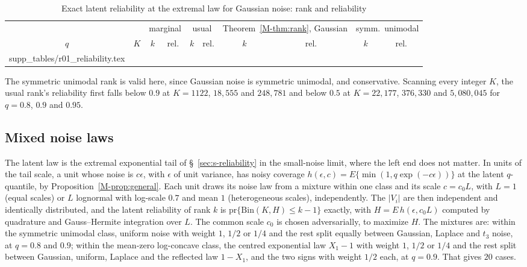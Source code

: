 \documentclass[12pt]{article}
\makeatletter
\newcommand{\tabinput}[1]{\@@input #1 }
\renewcommand{\_}{\usc\allowbreak}
\theoremstyle{definition}
\numberwithin{equation}{section}
\newcommand{\pr}{\mathrm{pr}}
\newcommand{\Bin}{\mathrm{Bin}}
\makeatother
\begin{document}
\begin{table}[htbp]
\renewcommand{\baselinestretch}{1}
\caption{Exact latent reliability at the extremal law for Gaussian noise: rank and reliability}
\label{tab:s-reliability}
\centering
\fontsize{9}{11pt}\selectfont
\begin{tabular}{cccccccccc}
\toprule
& & \multicolumn{2}{c}{marginal} & \multicolumn{2}{c}{usual} & \multicolumn{2}{c}{Theorem~\ref{M-thm:rank}, Gaussian} & \multicolumn{2}{c}{symm.\ unimodal} \\
$q$ & $K$ & $k$ & rel. & $k$ & rel. & $k$ & rel. & $k$ & rel. \\
\midrule
\tabinput{supp_tables/r01_reliability.tex}
\bottomrule
\end{tabular}
\par\smallskip
\parbox{0.95\textwidth}{\fontsize{8}{10pt}\selectfont The symmetric unimodal rank is valid here, since Gaussian noise is symmetric unimodal, and conservative. Scanning every integer $K$, the usual rank's reliability first falls below $0.9$ at $K = 1122$, $18{,}555$ and $248{,}781$ and below $0.5$ at $K = 22{,}177$, $376{,}330$ and $5{,}080{,}045$ for $q = 0.8$, $0.9$ and $0.95$.}
\end{table}

\subsection{Mixed noise laws}\label{sec:s-mixed}

The latent law is the extremal exponential tail of \S~\ref{sec:s-reliability} in the small-noise limit, where the left end does not matter. In units of the tail scale, a unit whose noise is $c\epsilon$, with $\epsilon$ of unit variance, has noisy coverage $h(\epsilon, c) = E\{\min(1, q\exp(-c\epsilon))\}$ at the latent $q$-quantile, by Proposition~\ref{M-prop:general}. Each unit draws its noise law from a mixture within one class and its scale $c = c_0L$, with $L = 1$ (equal scales) or $L$ lognormal with log-scale $0.7$ and mean $1$ (heterogeneous scales), independently. The $|V_i|$ are then independent and identically distributed, and the latent reliability of rank $k$ is $\pr\{\Bin(K, H) \le k - 1\}$ exactly, with $H = E\,h(\epsilon, c_0L)$ computed by quadrature and Gauss--Hermite integration over $L$. The common scale $c_0$ is chosen adversarially, to maximize $H$. The mixtures are: within the symmetric unimodal class, uniform noise with weight $1$, $1/2$ or $1/4$ and the rest split equally between Gaussian, Laplace and $t_3$ noise, at $q = 0.8$ and $0.9$; within the mean-zero log-concave class, the centred exponential law $X_1 - 1$ with weight $1$, $1/2$ or $1/4$ and the rest split between Gaussian, uniform, Laplace and the reflected law $1 - X_1$, and the two signs with weight $1/2$ each, at $q = 0.9$. That gives $20$ cases.
\end{document}
